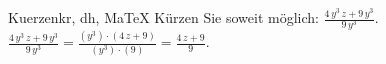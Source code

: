 \begin{MAufgabe}{Kuerzen}{kr, dh, MaTeX}
K\"urzen Sie soweit m\"oglich: $\frac{4\, y^3\, z + 9\, y^3}{9\, y^3}$.\\ 
\ifLsg\MLoesung
\quad $\frac{4\, y^3\, z + 9\, y^3}{9\, y^3}=\frac{(y^3)\cdot(4\, z + 9)}{(y^3)\cdot(9)}=\frac{4\, z + 9}{9}$.\else\relax\fi
 \end{MAufgabe}